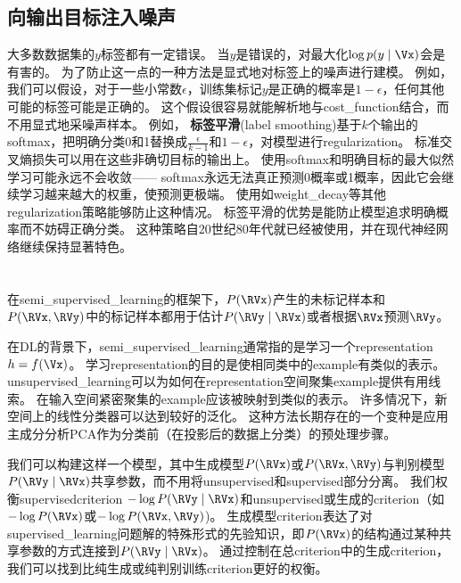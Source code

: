
\subsection{向输出目标注入噪声}
\label{sec:injecting_noise_at_the_output_targets}
大多数数据集的$y$标签都有一定错误。
当$y$是错误的，对最大化$\log p(y \mid \Vx)$会是有害的。
为了防止这一点的一种方法是显式地对标签上的噪声进行建模。
例如，我们可以假设，对于一些小常数$\epsilon$，训练集标记$y$是正确的概率是$1-\epsilon$，任何其他可能的标签可能是正确的。
这个假设很容易就能解析地与\gls{cost_function}结合，而不用显式地采噪声样本。
例如， \textbf{标签平滑}(label smoothing)基于$k$个输出的\gls{softmax}，把明确分类0和1替换成$\frac{\epsilon}{k-1}$和$1-\epsilon$，对模型进行\gls{regularization}。
标准交叉熵损失可以用在这些非确切目标的输出上。
使用\gls{softmax}和明确目标的最大似然学习可能永远不会收敛——
\gls{softmax}永远无法真正预测0概率或1概率，因此它会继续学习越来越大的权重，使预测更极端。
使用如\gls{weight_decay}等其他\gls{regularization}策略能够防止这种情况。
标签平滑的优势是能防止模型追求明确概率而不妨碍正确分类。
这种策略自20世纪80年代就已经被使用，并在现代神经网络继续保持显著特色\citep{Szegedy-et-al-2015}。


\section{}
\label{sec:semi_supervised_learning}
在\gls{semi_supervised_learning}的框架下，$P(\RVx)$产生的未标记样本和$P(\RVx, \RVy)$中的标记样本都用于估计$P(\RVy \mid \RVx)$或者根据$\RVx$预测$\RVy$。

在\gls{DL}的背景下，\gls{semi_supervised_learning}通常指的是学习一个\gls{representation} $h = f(\Vx)$。 
学习\gls{representation}的目的是使相同类中的\gls{example}有类似的表示。
\gls{unsupervised_learning}可以为如何在\gls{representation}空间聚集\gls{example}提供有用线索。
在输入空间紧密聚集的\gls{example}应该被映射到类似的表示。
许多情况下，新空间上的线性分类器可以达到较好的泛化\citep{Belkin+Niyogi-2002,Chapelle+al-2003}。
这种方法长期存在的一个变种是应用主成分分析\gls{PCA}作为分类前（在投影后的数据上分类）的预处理步骤。

我们可以构建这样一个模型，其中生成模型$P(\RVx)$或$P(\RVx, \RVy)$与判别模型$P(\RVy \mid \RVx)$共享参数，而不用将\gls{unsupervised}和\gls{supervised}部分分离。
我们权衡\gls{supervised}\gls{criterion} $-\log P(\RVy \mid \RVx)$和\gls{unsupervised}或生成的\gls{criterion}（如$-\log P(\RVx)$或$-\log P(\RVx, \RVy)$)。
生成模型\gls{criterion}表达了对\gls{supervised_learning}问题解的特殊形式的先验知识\citep{LasserreJ2006}，即$P(\RVx)$的结构通过某种共享参数的方式连接到$P(\RVy \mid \RVx)$。
通过控制在总\gls{criterion}中的生成\gls{criterion}，我们可以找到比纯生成或纯判别训练\gls{criterion}更好的权衡\citep{LasserreJ2006,Larochelle2008}。

